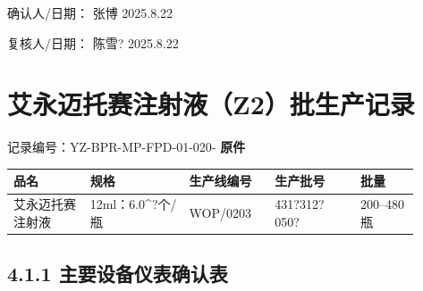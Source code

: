 \documentclass[UTF8,10pt,a4paper,fontset=fandol]{ctexart}
\newcommand{\fieldvalue}[1]{#1}
\newcommand{\handwritten}[1]{#1}
\begin{document}
\medskip

确认人/日期：
\fieldvalue{\handwritten{张博}}\quad
\fieldvalue{\handwritten{2025.8.22}}

\hfill
复核人/日期：
\fieldvalue{\handwritten{陈雪?}}\quad
\fieldvalue{\handwritten{2025.8.22}}

\newpage

\section*{艾永迈托赛注射液（Z2）批生产记录}

\noindent
记录编号：YZ-BPR-MP-FPD-01-020- \hfill
\textbf{原件}

\begin{tabular}{|p{0.17\linewidth}|p{0.22\linewidth}|p{0.19\linewidth}|p{0.19\linewidth}|p{0.13\linewidth}|}
\hline
品名 & 规格 & 生产线编号 & 生产批号 & 批量 \\
\hline
\fieldvalue{艾永迈托赛注射液} &
\fieldvalue{12ml：6.0\times10^{?}个/瓶} &
\fieldvalue{\handwritten{WOP/0203}} &
\fieldvalue{\handwritten{431?312?050?}} &
\fieldvalue{200--480 瓶} \\
\hline
\end{tabular}

\subsection*{4.1.1 主要设备仪表确认表}
\end{document}
